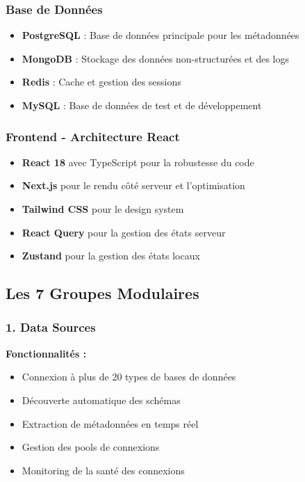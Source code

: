 \documentclass[12pt,a4paper]{article}
\begin{document}
\subsubsection{Base de Données}
\begin{itemize}
    \item \textbf{PostgreSQL} : Base de données principale pour les métadonnées
    \item \textbf{MongoDB} : Stockage des données non-structurées et des logs
    \item \textbf{Redis} : Cache et gestion des sessions
    \item \textbf{MySQL} : Base de données de test et de développement
\end{itemize}

\subsubsection{Frontend - Architecture React}
\begin{itemize}
    \item \textbf{React 18} avec TypeScript pour la robustesse du code
    \item \textbf{Next.js} pour le rendu côté serveur et l'optimisation
    \item \textbf{Tailwind CSS} pour le design system
    \item \textbf{React Query} pour la gestion des états serveur
    \item \textbf{Zustand} pour la gestion des états locaux
\end{itemize}

\subsection{Les 7 Groupes Modulaires}

\subsubsection{1. Data Sources}
\textbf{Fonctionnalités :}
\begin{itemize}
    \item Connexion à plus de 20 types de bases de données
    \item Découverte automatique des schémas
    \item Extraction de métadonnées en temps réel
    \item Gestion des pools de connexions
    \item Monitoring de la santé des connexions
\end{itemize}
\end{document}
